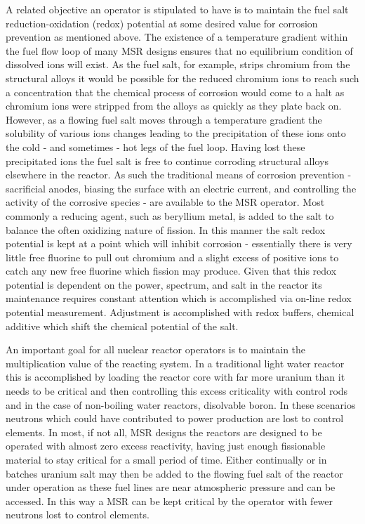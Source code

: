 A related objective an operator is stipulated to have is to maintain the fuel
salt reduction-oxidation (redox) potential at some desired value for corrosion
prevention as mentioned above. The existence of a temperature gradient within
the fuel flow loop of many MSR designs ensures that no equilibrium condition of
dissolved ions will exist. As the fuel salt, for example, strips chromium from
the structural alloys it would be possible for the reduced chromium ions to
reach such a concentration that the chemical process of corrosion would come to
a halt as chromium ions were stripped from the alloys as quickly as they
plate back on. However, as a flowing fuel salt moves through a temperature
gradient the solubility of various ions changes leading to the precipitation of
these ions onto the cold - and sometimes - hot legs of the fuel loop. Having
lost these precipitated ions the fuel salt is free to continue corroding
structural alloys elsewhere in the reactor. As such the traditional means of 
corrosion prevention - sacrificial anodes, biasing the surface with an electric
current, and controlling the activity of the corrosive species - are available
to the MSR operator. Most commonly a reducing agent, such as beryllium metal,
is added to the salt to balance the often oxidizing nature of fission. In
this manner the salt redox potential is kept at a point which will inhibit
corrosion - essentially there is very little free fluorine to pull out chromium
and a slight excess of positive ions to catch any new free fluorine which
fission may produce. Given that this redox potential is dependent on the power,
spectrum, and salt in the reactor its maintenance requires constant attention
which is accomplished via on-line redox potential measurement. Adjustment
is accomplished with redox buffers, chemical additive which shift the
chemical potential of the salt.

An important goal for all nuclear reactor
operators is to maintain the multiplication value of the reacting system. In a
traditional light water reactor this is accomplished by loading the reactor
core with far more uranium than it needs to be critical and then controlling
this excess criticality with control rods and in the case of non-boiling water
reactors, disolvable boron. In these scenarios neutrons which could have
contributed to power production are lost to control elements. In most, if not
all, MSR designs the reactors are designed to be operated with almost zero
excess reactivity, having just enough fissionable material to stay critical for
a small period of time. Either continually or in batches uranium salt may then
be added to the flowing fuel salt of the reactor under operation as these fuel
lines are near atmospheric pressure and can be accessed. In this way a MSR can
be kept critical by the operator with fewer neutrons lost to control elements.

